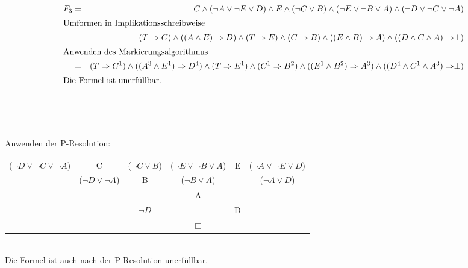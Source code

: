 \documentclass[10pt,a4paper,oneside,ngerman,numbers=noenddot]{scrartcl}
\begin{document}
\subsubsection{} %
\begin{alignat*}{2}
F_{3} &=& C \wedge (\neg A \vee \neg E \vee D) \wedge E \wedge (\neg C \vee B) \wedge (\neg E  \vee \neg B \vee A) \wedge (\neg D \vee \neg C \vee \neg A) \\
\intertext{Umformen in Implikationsschreibweise}
&=& (T \Rightarrow C) \wedge ((A \wedge E) \Rightarrow D) \wedge (T \Rightarrow E) \wedge (C \Rightarrow B) \wedge ((E \wedge B) \Rightarrow A) \wedge ((D \wedge C \wedge A) \Rightarrow \perp) \\
\intertext{Anwenden des Markierungsalgorithmus}
&=& (T \Rightarrow C^{1}) \wedge ((A^{3} \wedge E^{1}) \Rightarrow D^{4}) \wedge (T \Rightarrow E^{1}) \wedge (C^{1} \Rightarrow B^{2}) \wedge ((E^{1} \wedge B^{2}) \Rightarrow A^{3}) \wedge ((D^{4} \wedge C^{1} \wedge A^{3}) \Rightarrow \perp) \\
\intertext{Die Formel ist unerfüllbar.}
\end{alignat*}\\
\\\\\\
Anwenden der P-Resolution:\\
\begin{tabular}{cccccc}
($\neg D \vee \neg C \vee \neg A$) & C & ($\neg C \vee B$) & ($\neg E \vee \neg B \vee A$) & E & ($\neg A \vee \neg E \vee D$)  \\
& ($\neg D \vee \neg A$) & B & ($\neg B \vee A$) & & ($\neg A \vee D$) \\
& & & A & & \\
& & $\neg D$ & & D & \\
& & & $\Box$ & &
\end{tabular} \\
Die Formel ist auch nach der P-Resolution unerfüllbar.
\end{document}

